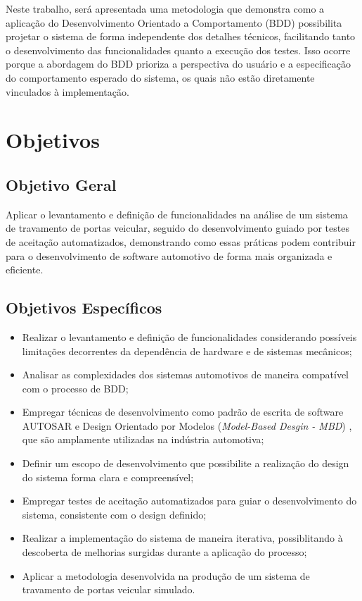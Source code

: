 Neste trabalho, será apresentada uma metodologia que demonstra como a aplicação do Desenvolvimento Orientado a Comportamento (BDD) possibilita projetar o 
sistema de forma independente dos detalhes técnicos, facilitando tanto o desenvolvimento das funcionalidades quanto a execução dos testes. Isso ocorre 
porque a abordagem do BDD prioriza a perspectiva do usuário e a especificação do comportamento esperado do sistema, os quais não estão diretamente vinculados 
à implementação.

\section{\textbf{Objetivos}}

\subsection{Objetivo Geral}
Aplicar o levantamento e definição de funcionalidades na análise de um sistema de travamento de portas veicular, seguido do desenvolvimento guiado por testes de 
aceitação automatizados, demonstrando como essas práticas podem contribuir para o desenvolvimento de software automotivo de forma mais organizada e eficiente.

\subsection{Objetivos Específicos}
\begin{itemize}
    \item Realizar o levantamento e definição de funcionalidades considerando possíveis limitações decorrentes da dependência de hardware e de sistemas mecânicos;
	\item Analisar as complexidades dos sistemas automotivos de maneira compatível com o processo de BDD;
    \item Empregar técnicas de desenvolvimento como padrão de escrita de software AUTOSAR \cite{autosarClassic} e Design Orientado por Modelos (\textit{Model-Based Desgin - MBD}) \cite{mathworksMBD2024}, que são amplamente utilizadas na indústria automotiva;
    \item Definir um escopo de desenvolvimento que possibilite a realização do design do sistema forma clara e compreensível;
    \item Empregar testes de aceitação automatizados para guiar o desenvolvimento do sistema, consistente com o design definido;
    \item Realizar a implementação do sistema de maneira iterativa, possiblitando à descoberta de melhorias surgidas durante a aplicação do processo;
    \item Aplicar a metodologia desenvolvida na produção de um sistema de travamento de portas veicular simulado.
\end{itemize}

